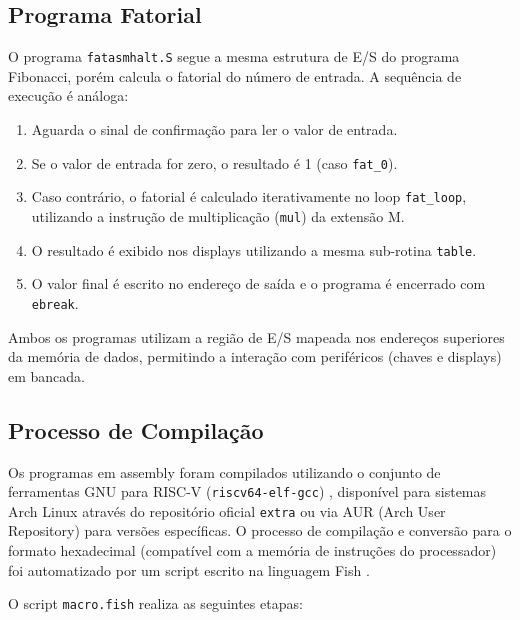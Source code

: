 \documentclass[
	12pt,				%
	oneside,
	a4paper,			%
	english,			%
	french,				%
	spanish,			%
	brazil,				%
	]{abntex2}
\begin{document}
\subsection{Programa Fatorial}

O programa \texttt{fatasmhalt.S} segue a mesma estrutura de E/S do programa Fibonacci, porém calcula o fatorial do número de entrada. A sequência de execução é análoga:

\begin{enumerate}
  \item Aguarda o sinal de confirmação para ler o valor de entrada.
  \item Se o valor de entrada for zero, o resultado é 1 (caso \texttt{fat\_0}).
  \item Caso contrário, o fatorial é calculado iterativamente no loop \texttt{fat\_loop}, utilizando a instrução de multiplicação (\texttt{mul}) da extensão M.
  \item O resultado é exibido nos displays utilizando a mesma sub-rotina \texttt{table}.
  \item O valor final é escrito no endereço de saída e o programa é encerrado com \texttt{ebreak}.
\end{enumerate}

Ambos os programas utilizam a região de E/S mapeada nos endereços superiores da memória de dados, permitindo a interação com periféricos (chaves e displays) em bancada.

\subsection{Processo de Compilação}

Os programas em assembly foram compilados utilizando o conjunto de ferramentas GNU para RISC-V (\texttt{riscv64-elf-gcc}) \cite{gcc_riscv}, disponível para sistemas Arch Linux através do repositório oficial \texttt{extra} ou via AUR (Arch User Repository) \cite{aur_gcc} para versões específicas. O processo de compilação e conversão para o formato hexadecimal (compatível com a memória de instruções do processador) foi automatizado por um script escrito na linguagem Fish \cite{fish_docs}.

O script \texttt{macro.fish} realiza as seguintes etapas:
\end{document}
